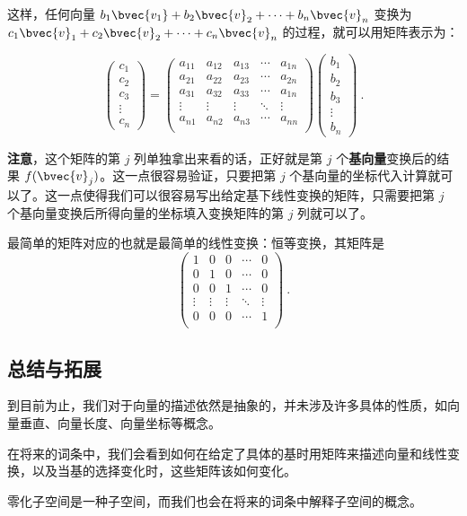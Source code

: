 这样，任何向量 $b_1\bvec{v_1}+b_2\bvec{v}_2+\cdots+b_n\bvec{v}_n$ 变换为 $c_1\bvec{v}_1+c_2\bvec{v}_2+\cdots+c_n\bvec{v}_n$ 的过程，就可以用矩阵表示为：

\begin{equation}
\begin{pmatrix}
c_1\\c_2\\c_3\\\vdots\\c_n
\end{pmatrix}
=
    \begin{pmatrix}
    a_{11}&a_{12}&a_{13}&\cdots&a_{1n}\\
    a_{21}&a_{22}&a_{23}&\cdots&a_{2n}\\
    a_{31}&a_{32}&a_{33}&\cdots&a_{1n}\\
    \vdots&\vdots&\vdots&\ddots&\vdots\\
    a_{n1}&a_{n2}&a_{n3}&\cdots&a_{nn}\\
    \end{pmatrix}
    \begin{pmatrix}
    b_1\\b_2\\b_3\\\vdots\\b_n
    \end{pmatrix}~.
\end{equation}

\textbf{注意}，这个矩阵的第 $j$ 列单独拿出来看的话，正好就是第 $j$ 个\textbf{基向量}变换后的结果 $f(\bvec{v}_j)$。这一点很容易验证，只要把第 $j$ 个基向量的坐标代入计算就可以了。这一点使得我们可以很容易写出给定基下线性变换的矩阵，只需要把第 $j$ 个基向量变换后所得向量的坐标填入变换矩阵的第 $j$ 列就可以了。

最简单的矩阵对应的也就是最简单的线性变换：恒等变换，其矩阵是
\begin{equation}
    \begin{pmatrix}
1&0&0&\cdots&0\\
0&1&0&\cdots&0\\
0&0&1&\cdots&0\\
\vdots&\vdots&\vdots&\ddots&\vdots\\
0&0&0&\cdots&1\\
    \end{pmatrix}~.
\end{equation}


\subsection{总结与拓展}

到目前为止，我们对于向量的描述依然是抽象的，并未涉及许多具体的性质，如向量垂直、向量长度、向量坐标等概念。

在将来的词条中，我们会看到如何在给定了具体的基时用矩阵来描述向量和线性变换，以及当基的选择变化时，这些矩阵该如何变化。

零化子空间是一种子空间，而我们也会在将来的词条中解释子空间的概念。
